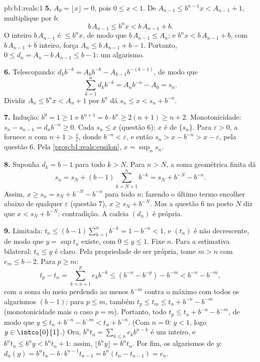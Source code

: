 \begin{solution}{pb:b1:reals:1}
\textbf{5.} $A_0 = \lfloor x \rfloor = 0$, pois $0 \leq x < 1$.
De $A_{n-1} \leq b^{n-1} x < A_{n-1} + 1$, multiplique por $b$:
\[
b\,A_{n-1} \leq b^n x < b\,A_{n-1} + b .
\]
O inteiro $b\,A_{n-1}$ é $\leq b^n x$, de modo que $b\,A_{n-1} \leq
A_n$; e $b^n x < b\,A_{n-1} + b$, com $b\,A_{n-1} + b$ inteiro,
força $A_n \leq b\,A_{n-1} + b - 1$. Portanto, $0 \leq d_n =
A_n - b\,A_{n-1} \leq b - 1$: um algarismo.

\textbf{6.} Telescopando: $d_k b^{-k} = A_k b^{-k} - A_{k-1}
b^{-(k-1)}$, de modo que
\[
\sum_{k=1}^n d_k b^{-k} = A_n b^{-n} - A_0 = s_n .
\]
Dividir $A_n \leq b^n x < A_n + 1$ por $b^n$ dá $s_n \leq x <
s_n + b^{-n}$.

\textbf{7.} Indução: $b^0 = 1 \geq 1$ e $b^{n+1} = b \cdot
b^n \geq 2(n + 1) \geq n + 2$. Monotonicidade: $s_n - s_{n-1} = d_n
b^{-n} \geq 0$. Cada $s_n \leq x$ (questão 6): $x$ é  de $\{s_n\}$. Para $\varepsilon > 0$, a  fornece $n$ com $n + 1 > \frac1\varepsilon$, donde
$b^{-n} < \varepsilon$, e então $s_n > x - b^{-n} > x -
\varepsilon$, pela questão 6. Pela \cref{prop:b1:reals:epsilon}, $x =
\sup_n s_n$.

\textbf{8.} Suponha $d_k = b - 1$ para todo $k > N$. Para $n > N$,
a soma geométrica finita dá
\[
s_n = s_N + (b - 1)\sum_{k=N+1}^{n} b^{-k}
= s_N + b^{-N} - b^{-n} .
\]
Assim, $x \geq s_n = s_N + b^{-N} - b^{-n}$ para todo $n$; fazendo
o último termo encolher abaixo de qualquer $\varepsilon$ (questão 7), $x
\geq s_N + b^{-N}$. Mas a questão 6 no posto $N$ diz que $x < s_N +
b^{-N}$: contradição. A cadeia $(d_n)$ é própria.

\textbf{9.} Limitada: $t_n \leq (b-1)\sum_{k=1}^n b^{-k} = 1 -
b^{-n} < 1$, e $(t_n)$ é não decrescente, de modo que $y = \sup t_n$
existe, com $0 \leq y \leq 1$. Fixe $n$. Para a estimativa
bilateral: $t_n \leq y$ é claro. Pela propriedade de ser própria, tome
$m > n$ com $e_m \leq b - 2$. Para $p \geq m$:
\[
t_p - t_n = \sum_{k=n+1}^{p} e_k b^{-k}
\leq (b^{-n} - b^{-p}) - b^{-m} < b^{-n} - b^{-m},
\]
com a soma do meio perdendo ao menos $b^{-m}$ contra o máximo com todos
os algarismos $(b-1)$; para $p \leq m$, também $t_p \leq t_m \leq t_n + b^{-n} -
b^{-m}$ (monotonicidade mais o caso $p = m$). Portanto, todo
$t_p \leq t_n + b^{-n} - b^{-m}$, de modo que $y \leq t_n + b^{-n} -
b^{-m} < t_n + b^{-n}$. (Com $n = 0$: $y < 1$, logo $y \in
\intco{0}{1}$.) Ora, $b^n t_n = \sum_{k \leq n} e_k b^{n-k}$ é um
inteiro, e $b^n t_n \leq b^n y < b^n t_n + 1$: assim, $\lfloor b^n
y \rfloor = b^n t_n$. Por fim, os algarismos de $y$: $d_n(y) = b^n
t_n - b \cdot b^{n-1} t_{n-1} = b^n(t_n - t_{n-1}) = e_n$.


\end{solution}
